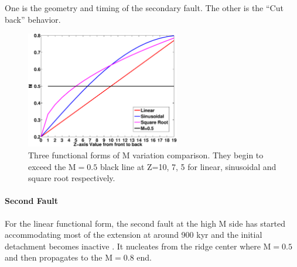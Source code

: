  One is the geometry and timing of the secondary fault. The other is the ``Cut back'' behavior. 

\begin{figure}[h]
  \centering
    \includegraphics[width=0.6\textwidth]{./Figures/fig_Results3_1.eps}
  \caption{Three functional forms of M variation comparison. They begin to exceed the M$=0.5$ black line at Z=10, 7, 5 for linear, sinusoidal and square root respectively.}
 \label{fig_Results3_1}
\end{figure}   

\paragraph{Second Fault}\label{para_SecondaryFault}

For the linear functional form, the second fault  at the high M side has started accommodating most of the extension at around 900 kyr and the initial detachment becomes inactive . It nucleates from the ridge center where M$=0.5$ and then propagates to the M$=0.8$ end. %

